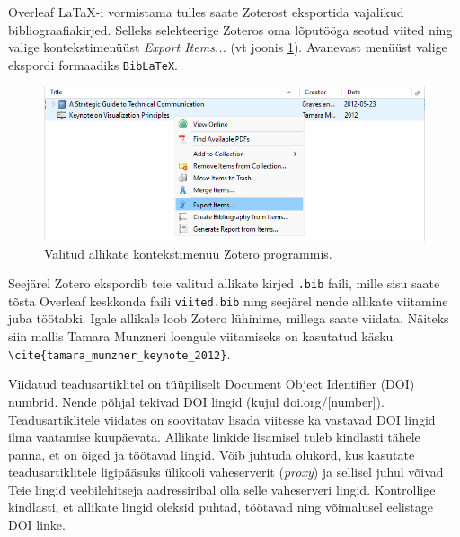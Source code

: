 Overleaf LaTaX-i vormistama tulles saate Zoterost eksportida vajalikud bibliograafiakirjed. Selleks selekteerige Zoteros oma lõputööga seotud viited ning valige kontekstimenüüst \emph{Export Items...} (vt joonis \ref{fig:zoteroKontekst}). Avanevast menüüst valige ekspordi formaadiks \verb|BibLaTeX|.

\begin{figure}[htb!]
    \centering
    \captionsetup{justification=centering}
    \includegraphics[width=\textwidth]{figures/Joonis3-ZoteroBibliograafiaEksport.png}
    \caption{Valitud allikate kontekstimenüü Zotero programmis.}
    \label{fig:zoteroKontekst}
\end{figure}

Seejärel Zotero ekspordib teie valitud allikate kirjed \verb|.bib| faili, mille sisu saate tõsta Overleaf keskkonda faili \verb|viited.bib| ning seejärel nende allikate viitamine juba töötabki. Igale allikale loob Zotero lühinime, millega saate viidata. Näiteks siin mallis Tamara Munzneri loengule viitamiseks on kasutatud käsku \verb|\cite{tamara_munzner_keynote_2012}|.

Viidatud teadusartiklitel on tüüpiliselt Document Object Identifier (DOI) numbrid. Nende põhjal tekivad DOI lingid  (kujul doi.org/[number]). Teadusartiklitele viidates on soovitatav lisada viitesse ka vastavad DOI lingid ilma vaatamise kuupäevata. Allikate linkide lisamisel tuleb kindlasti tähele panna, et on õiged ja töötavad lingid. Võib juhtuda olukord, kus kasutate teadusartiklitele ligipääsuks ülikooli vaheserverit (\emph{proxy}) ja sellisel juhul võivad Teie lingid veebilehitseja aadressiribal olla selle vaheserveri lingid. Kontrollige kindlasti, et allikate lingid oleksid puhtad, töötavad ning võimalusel eelistage DOI linke.

